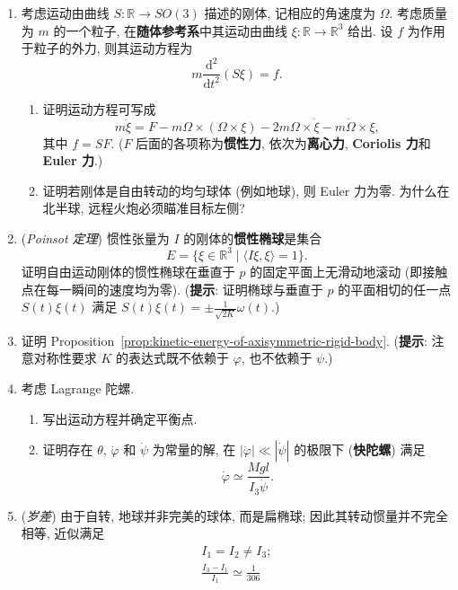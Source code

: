 \begin{RiemannExercise}
\begin{enumerate}[label=(\arabic*),ref=\arabic*,leftmargin=*]
\[\]
地球的自转轴很接近 $e_3$, 但绕 $e_3$ 进动 (\textbf{Chandler 进动}). 求这一进动在地球参考系中的周期.
\item\label{ex:inertial-forces-in-rotating-frame} 考虑运动由曲线 $S:\mathbb{R}\to SO(3)$ 描述的刚体, 记相应的角速度为 $\Omega$. 考虑质量为 $m$ 的一个粒子, 在\textbf{随体参考系}中其运动由曲线 $\xi:\mathbb{R}\to\mathbb{R}^3$ 给出. 设 $f$ 为作用于粒子的外力, 则其运动方程为
\[
  m\frac{\mathrm{d}^2}{\mathrm{d}t^2}(S\xi)=f.
\]
\begin{enumerate}[label=(\alph*),leftmargin=*]
\item 证明运动方程可写成
\[
  m\ddot\xi=F-m\Omega\times(\Omega\times\xi)-2m\Omega\times\dot\xi-m\dot\Omega\times\xi,
\]
其中 $f=SF$. ($F$ 后面的各项称为\textbf{惯性力}, 依次为\textbf{离心力}, \textbf{Coriolis 力}和 \textbf{Euler 力}.)
\item 证明若刚体是自由转动的均匀球体 (例如地球), 则 Euler 力为零. 为什么在北半球, 远程火炮必须瞄准目标左侧?
\end{enumerate}
\item\label{ex:poinsot-theorem} (\emph{Poinsot 定理}) 惯性张量为 $I$ 的刚体的\textbf{惯性椭球}是集合
\[
  E=\bigl\{\xi\in\mathbb{R}^3\mid\langle I\xi,\xi\rangle=1\bigr\}.
\]
证明自由运动刚体的惯性椭球在垂直于 $p$ 的固定平面上无滑动地滚动 (即接触点在每一瞬间的速度均为零). (\textbf{提示}: 证明椭球与垂直于 $p$ 的平面相切的任一点 $S(t)\xi(t)$ 满足 $S(t)\xi(t)=\pm\frac{1}{\sqrt{2K}}\omega(t)$.)
\item\label{ex:derive-axisymmetric-kinetic-energy} 证明 Proposition~\ref{prop:kinetic-energy-of-axisymmetric-rigid-body}. (\textbf{提示}: 注意对称性要求 $K$ 的表达式既不依赖于 $\varphi$, 也不依赖于 $\psi$.)
\item\label{ex:lagrange-top} 考虑 Lagrange 陀螺.
\begin{enumerate}[label=(\alph*),leftmargin=*]
\item 写出运动方程并确定平衡点.
\item 证明存在 $\theta$, $\dot\varphi$ 和 $\dot\psi$ 为常量的解, 在 $|\dot\varphi|\ll|\dot\psi|$ 的极限下 (\textbf{快陀螺}) 满足
\[
  \dot\varphi\simeq\frac{Mgl}{I_3\dot\psi}.
\]
\end{enumerate}
\item\label{ex:precession-of-the-equinoxes} (\emph{岁差}) 由于自转, 地球并非完美的球体, 而是扁椭球; 因此其转动惯量并不完全相等, 近似满足
\[
  \begin{gathered}
    I_1=I_2\ne I_3;\\
    \frac{I_3-I_1}{I_1}\simeq\frac{1}{306}
  \end{gathered}
\]
\end{enumerate}
\end{RiemannExercise}
